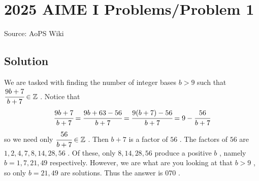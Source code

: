 \documentclass[12pt]{article}
\begin{document}
\section*{{2025 AIME I Problems/Problem 1}}
Source: AoPS Wiki

\subsection*{Solution}
We are tasked with finding the number of integer bases $b>9$ such that $\cfrac{9b+7}{b+7}\in\mathbb{Z}$ . Notice that \[\cfrac{9b+7}{b+7}=\cfrac{9b+63-56}{b+7}=\cfrac{9(b+7)-56}{b+7}=9-\cfrac{56}{b+7}\] so we need only $\cfrac{56}{b+7}\in\mathbb{Z}$ . Then $b+7$ is a factor of $56$ . The factors of $56$ are $1,2,4,7,8,14,28,56$ . Of these, only $8,14,28,56$ produce a positive $b$ , namely $b=1,7,21,49$ respectively. However, we are what are you looking at that $b>9$ , so only $b=21,49$ are solutions. Thus the answer is $070$ .
\end{document}
